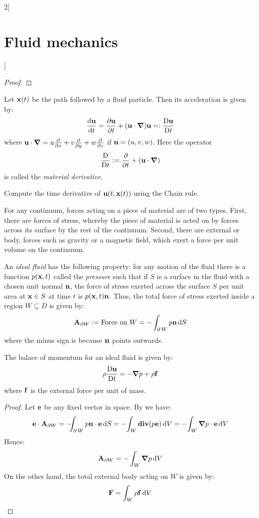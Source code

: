 \documentclass[../../../main_physics.tex]{subfiles}
\begin{document}
\begin{multicols}{2}[\section{Fluid mechanics}]
\begin{proof}
  \end{proof}
  \begin{lemma}
    Let $\boldsymbol{\mathrm{x}}(t)$ be the path followed by a fluid particle. Then its acceleration is given by:
    $$
      \dv{\boldsymbol{\mathrm{u}}}{t}=\pdv{\boldsymbol{\mathrm{u}}}{t}+(\boldsymbol{\mathrm{u}}\cdot\grad)\boldsymbol{\mathrm{u}}=:\frac{\mathrm{D}\boldsymbol{\mathrm{u}}}{\mathrm{D}t}
    $$
    where $\boldsymbol{\mathrm{u}}\cdot \grad=u\pdv{}{x}+v\pdv{}{y}+w\pdv{}{z}$ if $\boldsymbol{\mathrm{u}}=(u,v,w)$. Here the operator $$\frac{\mathrm{D}}{\mathrm{D}t}:= \pdv{}{t}+(\boldsymbol{\mathrm{u}}\cdot\grad)$$ is called the \textit{material derivative}.
  \end{lemma}
  \begin{sproof}
    Compute the time derivative of $\boldsymbol{\mathrm{u}}(t,\boldsymbol{\mathrm{x}}(t))$ using the Chain rule.
  \end{sproof}
  For any continuum, forces acting on a piece of material are of two types. First, there are forces of stress, whereby the piece of material is acted on by forces across its surface by the rest of the continuum. Second, there are external or body, forces such as gravity or a magnetic field, which exert a force per unit volume on the continuum.
  \begin{definition}
    An \emph{ideal fluid} has the following property: for any motion of the fluid there is a function $p(\boldsymbol{\mathrm{x}},t)$ called the \emph{pressure} such that if $S$ is a surface in the fluid with a chosen unit normal $\boldsymbol{\mathrm{n}}$, the force of stress exerted across the surface $S$ per unit area at $\boldsymbol{\mathrm{x}}\in S$ at time $t$ is $p(\boldsymbol{\mathrm{x}},t)\boldsymbol{\mathrm{n}}$. Thus, the total force of stress exerted inside a region $W\subseteq D$ is given by:
    $$
      \boldsymbol{\mathrm{A}}_{\partial W}:=\text{Force on $W$}=-\int_{\operatorname{\partial}{W}}p\boldsymbol{\mathrm{n}}\dd{S}
    $$
    where the minus sign is because $\boldsymbol{\mathrm{n}}$ points outwards.
  \end{definition}
  \begin{proposition}
    The balace of momentum for an ideal fluid is given by:
    $$
      \rho\frac{\mathrm{D}\boldsymbol{\mathrm{u}}}{\mathrm{D}t}=-\grad p+\rho\boldsymbol{\mathrm{f}}
    $$
    where $\boldsymbol{\mathrm{f}}$ is the external force per unit of mass.
  \end{proposition}
  \begin{proof}
    Let $\boldsymbol{\mathrm{e}}$ be any fixed vector in space. By  we have:
    $$
      \boldsymbol{\mathrm{e}}\cdot\boldsymbol{\mathrm{A}}_{\partial W}=-\!\!\!\int_{\operatorname{\partial}{W}}p\boldsymbol{\mathrm{n}}\cdot\boldsymbol{\mathrm{e}}\dd{S}=-\!\int_W\operatorname{\boldsymbol{\mathrm{div}}}(p\boldsymbol{\mathrm{e}})\dd{V}=-\!\int_W\grad p\cdot\boldsymbol{\mathrm{e}}\dd{V}
    $$
    Hence:
    $$
      \boldsymbol{\mathrm{A}}_{\partial W}=-\int_W\grad p\dd{V}
    $$
    On the other hand, the total external body acting on $W$ is given by:
    $$
      \boldsymbol{\mathrm{F}}=\int_W\rho\boldsymbol{\mathrm{f}}\dd{V}
$$
\end{proof}
\end{multicols}
\end{document}
